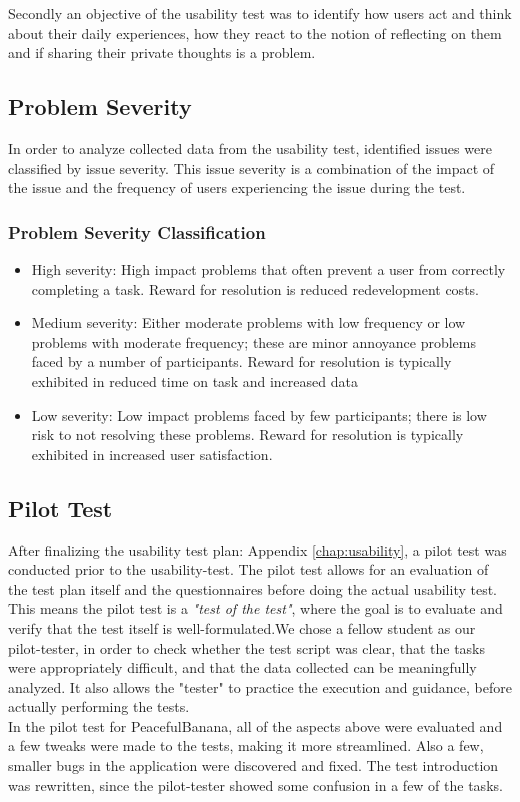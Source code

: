 Secondly an objective of the usability test was to identify how users act and think about their daily experiences, how they react to the notion of reflecting on them and if sharing their private thoughts is a problem. 

\subsection{Problem Severity}
In order to analyze collected data from the usability test, identified issues were classified by issue severity. This issue severity is a combination of the impact of the issue and the frequency of users experiencing the issue during the test. 
\subsubsection{Problem Severity Classification}
	\begin{itemize}
		\item High severity: High impact problems that often prevent a user from correctly completing a task. Reward for resolution is reduced redevelopment costs.
		\item Medium severity: Either moderate problems with low frequency or low problems with moderate frequency; these are minor annoyance problems faced by a number of participants. Reward for resolution is typically exhibited in reduced time on task and increased data
		\item Low severity: Low impact problems faced by few participants; there is low risk to not resolving these problems. Reward for resolution is typically exhibited in increased user satisfaction.
	\end{itemize}

\subsection*{Pilot Test}
After finalizing the usability test plan: Appendix \ref{chap:usability}, a pilot test was conducted prior to the usability-test\citep{usabilitygov}. The pilot test allows for an evaluation of the test plan itself and the questionnaires before doing the actual usability test. This means the pilot test is a \emph{"test of the test"}, where the goal is to evaluate and verify that the test itself is well-formulated.We chose a fellow student as our pilot-tester, in order to check whether the test script was clear, that the tasks were appropriately difficult, and that the data collected can be meaningfully analyzed. 
It also allows the "tester" to practice the execution and guidance, before actually performing the tests. \\
In the pilot test for PeacefulBanana, all of the aspects above were evaluated and a few tweaks were made to the tests, making it more streamlined. Also a few, smaller bugs in the application were discovered and fixed. The test introduction was rewritten, since the pilot-tester showed some confusion in a few of the tasks. 

